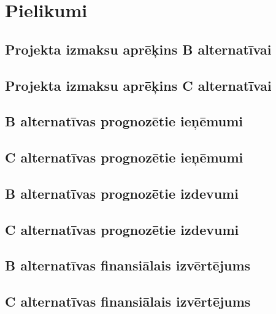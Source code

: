 \appendix
\chapter*{Pielikumi}
\renewcommand{\thesection}{\arabic{section}}
    
    
    
    
    
    
\section{Projekta izmaksu aprēķins B alternatīvai}
	\label{app:B_izmaksas}
    \clearpage
\section{Projekta izmaksu aprēķins C alternatīvai}
	\label{app:C_izmaksas}
    \clearpage
\section{B alternatīvas prognozētie ieņēmumi}
	\label{app:B_ienemumi}
    \clearpage
\section{C alternatīvas prognozētie ieņēmumi}
	\label{app:C_ienemumi}
    \clearpage
\section{B alternatīvas prognozētie izdevumi}
	\label{app:B_izdevumi}
    \clearpage
\section{C alternatīvas prognozētie izdevumi}
	\label{app:C_izdevumi}
    \clearpage
\section{B alternatīvas finansiālais izvērtējums}
	\label{app:B_finansialais_vertejums}
    \clearpage
\section{C alternatīvas finansiālais izvērtējums}
	\label{app:C_finansialais_vertejums}
    \clearpage

